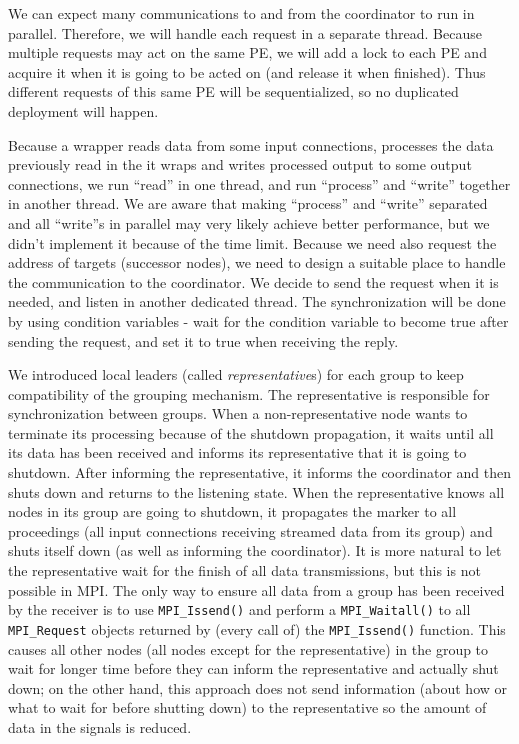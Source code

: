 We can expect many communications to and from the coordinator to run in parallel. Therefore, we will handle each request in a separate thread. Because multiple requests may act on the same PE, we will add a lock to each PE and acquire it when it is going to be acted on (and release it when finished). Thus different requests of this same PE will be sequentialized, so no duplicated deployment will happen.

Because a wrapper reads data from some input connections, processes the data previously read in the \tPEInst it wraps and writes processed output to some output connections, we run ``read'' in one thread, and run ``process'' and ``write'' together in another thread. We are aware that making ``process'' and ``write'' separated and all ``write''s in parallel may very likely achieve better performance, but we didn't implement it because of the time limit. Because we need also request the address of targets (successor nodes), we need to design a suitable place to handle the communication to the coordinator. We decide to send the request when it is needed, and listen in another dedicated thread. The synchronization will be done by using condition variables - wait for the condition variable to become true after sending the request, and set it to true when receiving the reply.

We introduced local leaders (called \emph{representative}s) for each group to keep compatibility of the grouping mechanism. The representative is responsible for synchronization between groups. When a non-representative node wants to terminate its processing because of the shutdown propagation, it waits until all its data has been received and informs its representative that it is going to shutdown. After informing the representative, it informs the coordinator and then shuts down and returns to the listening state. When the representative knows all nodes in its group are going to shutdown, it propagates the \dEOS marker to all proceedings (\ie all input connections receiving streamed data from its group) and shuts itself down (as well as informing the coordinator). It is more natural to let the representative wait for the finish of all data transmissions, but this is not possible in MPI. The only way to ensure all data from a group has been received by the receiver is to use \lstinline|MPI_Issend()| and perform a \lstinline|MPI_Waitall()| to all \lstinline|MPI_Request| objects returned by (every call of) the \lstinline|MPI_Issend()| function. This causes all other nodes (\ie all nodes except for the representative) in the group to wait for longer time before they can inform the representative and actually shut down; on the other hand, this approach does not send information (about how or what to wait for before shutting down) to the representative so the amount of data in the signals is reduced.

